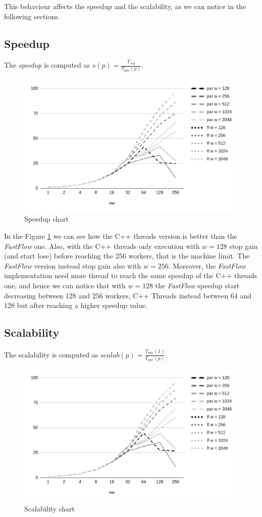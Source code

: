 This behaviour affects the speedup and the scalability, as we can notice in the following sections.



\subsection{Speedup}
The \textit{speedup} is computed as $s(p) = \frac{T_{seq}}{T_{par}(p)}$.

\begin{figure}[H]
    \centering
    \includegraphics[width=.8\linewidth]{assets/speedup}
    \bigskip
    \caption{Speedup chart}
    \label{fig:speedup}
\end{figure}

\noindent
In the Figure \ref{fig:speedup} we can see how the C++ threads version is better than the \textit{FastFlow} one. Also, with the C++ threads only execution with $w = 128$ stop gain (and start lose) before reaching the $256$ workers, that is the machine limit. The \textit{FastFlow} version instead stop gain also with $w = 256$. Moreover, the \textit{FastFlow} implementation need more thread to reach the same speedup of the C++ threads one, and hence we can notice that with $w = 128$ the \textit{FastFlow} speedup start decreasing between $128$ and $256$ workers, C++ Threads instead between $64$ and $128$ but after reaching a higher speedup value.



\subsection{Scalability}
The scalability is computed as $scalab(p) = \frac{T_{par}(1)}{T_{par}(p)}$.

\begin{figure}[H]
    \centering
    \includegraphics[width=.8\linewidth]{assets/scalability}
    \caption{Scalability chart}
    \label{fig:scalability}
\end{figure}

